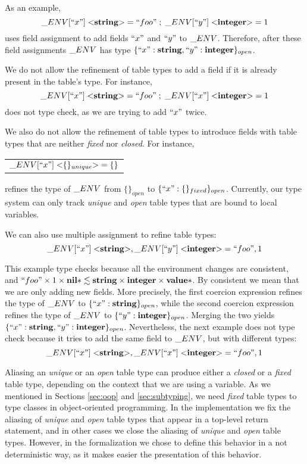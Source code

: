 As an example,
\[
\string_ENV[``x"] \; {<}\String{>} = ``foo" \;;\; \string_ENV[``y"] \; {<}\Integer{>} = 1
\]
uses field assignment to add fields $``x"$ and $``y"$ to $\string_ENV$.
Therefore, after these field assignments $\string_ENV$ has type
$\{``x":\mathbf{string}, ``y":\mathbf{integer}\}_{open}$.

We do not allow the refinement of table types to add a field if it is
already present in the table's type.
For instance,
\[
\string_ENV[``x"] \; {<}\String{>} = ``foo" \;;\; \string_ENV[``x"] \; {<}\Integer{>} = 1
\]
does not type check, as we are trying to add $``x"$ twice.

We also do not allow the refinement of table types to introduce
fields with table types that are neither \emph{fixed} nor \emph{closed}.
For instance,
\begin{center}
\begin{tabular}{l}
$\string_ENV[``x"] \; {<}\{\}_{unique}{>} = \{\}$
\end{tabular}
\end{center}
refines the type of $\string_ENV$ from $\{\}_{open}$ to $\{``x":\{\}_{fixed}\}_{open}$.
Currently, our type system can only track \emph{unique} and
\emph{open} table types that are bound to local variables.

We can also use multiple assignment to refine table types:
\[
\string_ENV[``x"] \; {<}\String{>}, \string_ENV[``y"] \; {<}\Integer{>} = ``foo", 1
\]

This example type checks because all the environment changes are consistent, and
$``foo" \times 1 \times \mathbf{nil}{*} \lesssim \mathbf{string} \times \mathbf{integer} \times \mathbf{value}{*}$.
By consistent we mean that we are only adding new fields.
More precisely, the first coercion expression refines the type of $\string_ENV$
to $\{``x":\mathbf{string}\}_{open}$, while
the second coercion expression refines the type of $\string_ENV$
to $\{``y":\mathbf{integer}\}_{open}$.
Merging the two yields $\{``x":\mathbf{string}, ``y":\mathbf{integer}\}_{open}$.
Nevertheless, the next example does not type check because it tries to add
the same field to $\string_ENV$, but with different types:
\[
\string_ENV[``x"] \; {<}\String{>}, \string_ENV[``x"] \; {<}\Integer{>} = ``foo", 1
\]

Aliasing an \emph{unique} or an \emph{open} table type can produce
either a \emph{closed} or a \emph{fixed} table type, depending on
the context that we are using a variable.
As we mentioned in Sections \ref{sec:oop} and \ref{sec:subtyping},
we need \emph{fixed} table types to type classes in object-oriented programming.
In the implementation we fix the aliasing of \emph{unique} and \emph{open}
table types that appear in a top-level return statement, and in other cases we
close the aliasing of \emph{unique} and \emph{open} table types.
However, in the formalization we chose to define this behavior in
a not deterministic way, as it makes easier the presentation of this behavior.

